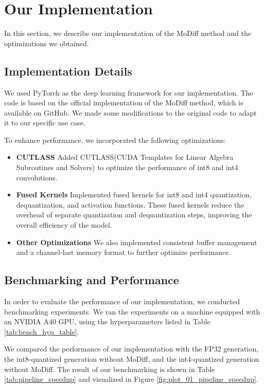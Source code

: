 \section{Our Implementation}

In this section, we describe our implementation of the MoDiff method and the optimizations we obtained.
\subsection{Implementation Details}

We used PyTorch as the deep learning framework for our implementation. The code is based on the official implementation of the MoDiff method, which is available on GitHub. We made some modifications to the original code to adapt it to our specific use case.

To enhance performance, we incorporated the following optimizations:
\begin{itemize}
    \item {\textbf{CUTLASS}} Added CUTLASS(CUDA Templates for Linear Algebra Subroutines and Solvers) to optimize the performance of int8 and int4 convolutions.

    \item {\textbf{Fused Kernels}} Implemented fused kernels for int8 and int4 quantization, dequantization, and activation functions. These fused kernels reduce the overhead of separate quantization and dequantization steps, improving the overall efficiency of the model.

    \item {\textbf{Other Optimizations}} We also implemented consistent buffer management and a channel-last memory format to further optimize performance.
\end{itemize}

\subsection{Benchmarking and Performance}

In order to evaluate the performance of our implementation, we conducted benchmarking experiments. We ran the experiments on a machine equipped with an NVIDIA A40 GPU, using the hyperparameters listed in Table \ref{tab:bench_hyp_table}.



We compared the performance of our implementation with the FP32 generation, the int8-quantized generation without MoDiff, and the int4-quantized generation without MoDiff. The result of our benchmarking is shown in Table \ref{tab:pipeline_speedup} and visualized in Figure \ref{fig:plot_01_pipeline_speedup}.

